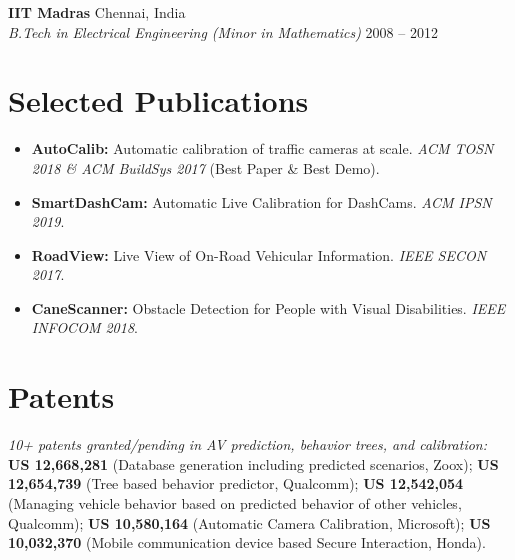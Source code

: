 \documentclass[10pt,letterpaper]{article}
\begin{document}
\textbf{IIT Madras} \hfill Chennai, India \\
\textit{B.Tech in Electrical Engineering (Minor in Mathematics)} \hfill 2008 -- 2012

\section{Selected Publications}
\begin{itemize}
    \item \textbf{AutoCalib:} Automatic calibration of traffic cameras at scale. \textit{ACM TOSN 2018 \& ACM BuildSys 2017} (Best Paper \& Best Demo).
    \item \textbf{SmartDashCam:} Automatic Live Calibration for DashCams. \textit{ACM IPSN 2019}.
    \item \textbf{RoadView:} Live View of On-Road Vehicular Information. \textit{IEEE SECON 2017}.
    \item \textbf{CaneScanner:} Obstacle Detection for People with Visual Disabilities. \textit{IEEE INFOCOM 2018}.
\end{itemize}

\section{Patents}
\textit{10+ patents granted/pending in AV prediction, behavior trees, and calibration:} \textbf{US 12,668,281} (Database generation including predicted scenarios, Zoox); \textbf{US 12,654,739} (Tree based behavior predictor, Qualcomm); \textbf{US 12,542,054} (Managing vehicle behavior based on predicted behavior of other vehicles, Qualcomm); \textbf{US 10,580,164} (Automatic Camera Calibration, Microsoft); \textbf{US 10,032,370} (Mobile communication device based Secure Interaction, Honda).

\end{document}
